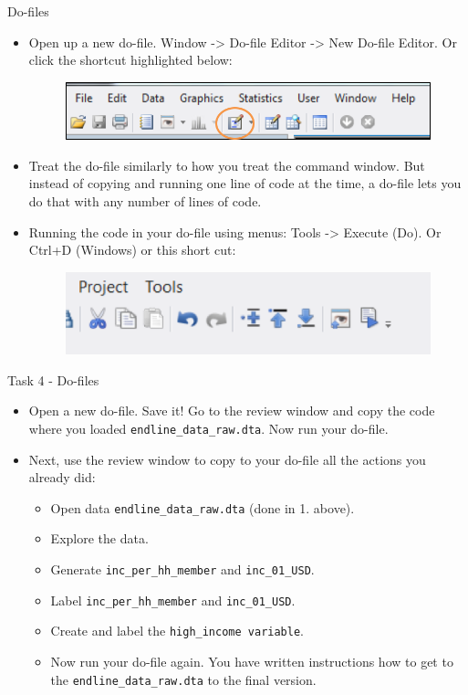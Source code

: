 \documentclass[aspectratio=169]{beamer}
\begin{document}
\begin{frame}{Do-files}
	\begin{itemize}
		\item Open up a new do-file. Window -> Do-file Editor -> New Do-file Editor. Or click the shortcut highlighted below:
		\begin{figure}
			\centering
			\includegraphics[width=.6\linewidth]{img/dofilewindow1}
		\end{figure}
		\item Treat the do-file similarly to how you treat the command window. But instead of copying and running one line of code at the time, a do-file lets you do that with any number of lines of code.
		\item Running the code in your do-file using menus: Tools -> Execute (Do). Or Ctrl+D (Windows) or this short cut:
		\begin{figure}
			\centering
			\includegraphics[width=.5\linewidth]{img/dofilewindow2}
		\end{figure}
	\end{itemize}
\end{frame}

\begin{frame}{Task 4 - Do-files}
	\begin{itemize}
		\item Open a new do-file. Save it! Go to the review window and copy the code where you loaded \texttt{endline\_data\_raw.dta}. Now run your do-file.
		\item Next, use the review window to copy to your do-file all the actions you already did:
		\begin{itemize}
			\item Open data \texttt{endline\_data\_raw.dta} (done in 1. above).
			\item Explore the data.
			\item Generate \texttt{inc\_per\_hh\_member} and \texttt{inc\_01\_USD}.
			\item Label \texttt{inc\_per\_hh\_member} and \texttt{inc\_01\_USD}.
			\item Create and label the \texttt{high\_income variable}.
			\item Now run your do-file again. You have written instructions how to get to the \texttt{endline\_data\_raw.dta} to the final version.
		\end{itemize}
	\end{itemize}
\end{frame}
\end{document}
